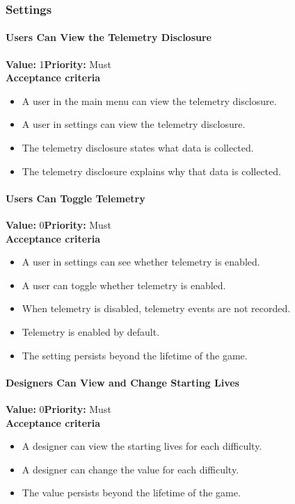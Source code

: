 \subsubsection{Settings}

\paragraph{Users Can View the Telemetry Disclosure}
\textbf{Value:} 1\quad \textbf{Priority:} Must\\
\textbf{Acceptance criteria}
\begin{itemize}
  \item A user in the main menu can view the telemetry disclosure.
  \item A user in settings can view the telemetry disclosure.
  \item The telemetry disclosure states what data is collected.
  \item The telemetry disclosure explains why that data is collected.
\end{itemize}

\paragraph{Users Can Toggle Telemetry}
\textbf{Value:} 0\quad \textbf{Priority:} Must\\
\textbf{Acceptance criteria}
\begin{itemize}
  \item A user in settings can see whether telemetry is enabled.
  \item A user can toggle whether telemetry is enabled.
  \item When telemetry is disabled, telemetry events are not recorded.
  \item Telemetry is enabled by default.
  \item The setting persists beyond the lifetime of the game.
\end{itemize}

\paragraph{Designers Can View and Change Starting Lives}
\textbf{Value:} 0\quad \textbf{Priority:} Must\\
\textbf{Acceptance criteria}
\begin{itemize}
  \item A designer can view the starting lives for each difficulty.
  \item A designer can change the value for each difficulty.
  \item The value persists beyond the lifetime of the game.
\end{itemize}

